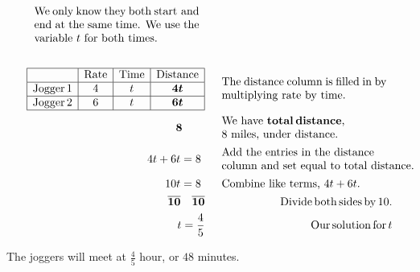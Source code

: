\begin{example}
\begin{eqnarray*}
\begin{array}{p{0.425\textwidth}}
      \tmop{We} \tmop{only} \tmop{know} \tmop{they} \tmop{both} \tmop{start}\tmop{~and} \tmop{end} \tmop{at} \tmop{the} \tmop{same} \tmop{time}. \tmop{We} \tmop{use} \tmop{the} \tmop{variable} $t$ \tmop{for} \tmop{both} \tmop{times}.
    \end{array}\\
    &  & \\
    \begin{array}{|c|c|c|c|}
      \hline
      & \tmop{Rate} & \tmop{Time} & \tmop{Distance}\\
      \hline
      \tmop{Jogger} 1 & 4 & t & \tmmathbf{4 t}\\
      \hline
      \tmop{Jogger} 2 & 6 & t & \tmmathbf{6 t}\\
      \hline
    \end{array} &  & \begin{array}{p{0.425\textwidth}}
      \tmop{The} \tmop{distance} \tmop{column} \tmop{is} \tmop{filled}
      \tmop{in} \tmop{by} \tmop{multiplying} \tmop{rate} \tmop{by} \tmop{time}.
    \end{array}\\
    \tmmathbf{8}~~~~~~  &  & \begin{array}{p{0.425\textwidth}}
      \tmop{We} \tmop{have} \tmmathbf{\tmop{total} \tmop{distance}},\\
			8 \tmop{miles}, \tmop{under} \tmop{distance}.
    \end{array}\\
    4 t + 6 t = 8~ &  & \begin{array}{p{0.425\textwidth}}
      \tmop{Add~the~entries~in~the~distance} \tmop{column~and~set~equal~to~total~distance}.
    \end{array}\\
    10 t = 8~ &  & \begin{array}{p{0.425\textwidth}}
      \tmop{Combine} \tmop{like} \tmop{terms}, $4t + 6t$.
    \end{array}\\
    \tmmathbf{\overline{10} ~~~ \overline{10}} &  & \tmop{~Divide} \tmop{both}
    \tmop{sides} \tmop{by} 10.\\
    t = \frac{4}{5} &  & \tmop{~Our} \tmop{solution} \tmop{for} t
		\end{eqnarray*}
\begin{center}
The joggers will meet at $\frac{4}{5}$ hour, or $48$ minutes.
\end{center}
\end{example}

